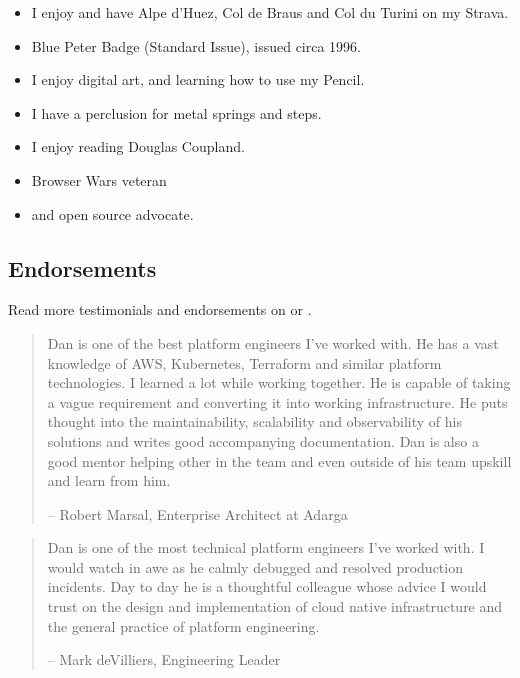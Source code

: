 \documentclass[
]{article}
\providecommand{\tightlist}{%
  \setlength{\itemsep}{0pt}\setlength{\parskip}{0pt}}
\begin{document}
\begin{itemize}
\tightlist
\item
  I enjoy \faBicycle and have Alpe d'Huez, Col de Braus and Col du
  Turini on my Strava.
\item
  Blue Peter Badge (Standard Issue), issued circa 1996.
\item
  I enjoy digital art, and learning how to use my \faApple Pencil.
\item
  I have a perclusion for metal springs and steps.
\item
  I enjoy reading Douglas Coupland.
\item
  Browser Wars veteran
\item
  \faLinux and open source advocate.
\end{itemize}

\hypertarget{material-thumb-up-endorsements}{%
\subsection{\texorpdfstring{\faThumbsUp
Endorsements}{ Endorsements}}\label{material-thumb-up-endorsements}}

Read more testimonials and endorsements on
\href{https://linkedin.com/in/danslinky}{\faLinkedin} or
\href{https://github.com/danslinky/danslinky.co.uk/issues/new/choose}{\faGithub}.

\begin{quote}
Dan is one of the best platform engineers I've worked with. He has a
vast knowledge of AWS, Kubernetes, Terraform and similar platform
technologies. I learned a lot while working together. He is capable of
taking a vague requirement and converting it into working
infrastructure. He puts thought into the maintainability, scalability
and observability of his solutions and writes good accompanying
documentation. Dan is also a good mentor helping other in the team and
even outside of his team upskill and learn from him.

-- Robert Marsal, Enterprise Architect at Adarga
\end{quote}

\begin{quote}
Dan is one of the most technical platform engineers I've worked with. I
would watch in awe as he calmly debugged and resolved production
incidents. Day to day he is a thoughtful colleague whose advice I would
trust on the design and implementation of cloud native infrastructure
and the general practice of platform engineering.

-- Mark deVilliers, Engineering Leader
\end{quote}
\end{document}

